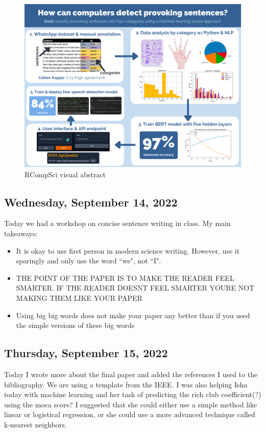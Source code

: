 \documentclass[11pt,letterpaper]{article}
\begin{document}
\begin{figure}
    \centering
    \includegraphics[scale=0.5]{images/vis.png}
    \caption{RCompSci visual abstract}
    \label{fig:vis}
\end{figure}

\subsection{Wednesday, September 14, 2022}
Today we had a workshop on concise sentence writing in class. My main takeaways:
\begin{itemize}
    \item It is okay to use first person in modern science writing. However, use it sparingly and only use the word ``we", not ``I".
    \item THE POINT OF THE PAPER IS TO MAKE THE READER FEEL SMARTER. IF THE READER DOESNT FEEL SMARTER YOURE NOT MAKING THEM LIKE YOUR PAPER
    \item Using big big words does not make your paper any better than if you used the simple versions of these big words
\end{itemize}

\subsection{Thursday, September 15, 2022}
Today I wrote more about the final paper and added the references I used to the bibliography. We are using a template from the IEEE. I was also helping Isha today with machine learning and her task of predicting the rich club coefficient(?) using the moca score? I suggested that she could either use a simple method like linear or logistical regression, or she could use a more advanced technique called k-nearest neighbors. 
\end{document}

